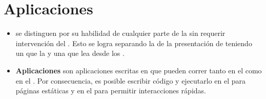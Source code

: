 
\section{Aplicaciones \webINT}\label{cap:estadoArte:section:web_app}

\begin{itemize}
	\item
		\textbf{\singlePageAppINT} se distinguen por su habilidad de \redrawCPT cualquier parte de la \uiSiglaAS sin requerir intervención del \serverAS. Esto se logra separando la \dataPC de la presentación de \dataPC teniendo un \modelLayerAS que \handleAS la \dataPC y una \viewsLayerAS que lea desde los \modelsAS.
	\item
		\textbf{Aplicaciones \isomorphicAS \javaScriptNAME} son aplicaciones escritas en \javaScriptNAME que pueden correr tanto en el \clientAS como en el \serverAS. Por consecuencia, es posible escribir código y ejecutarlo en el \serverAS para \renderCPT páginas estáticas y en el \clientAS para permitir interacciones rápidas.
\end{itemize}

%

